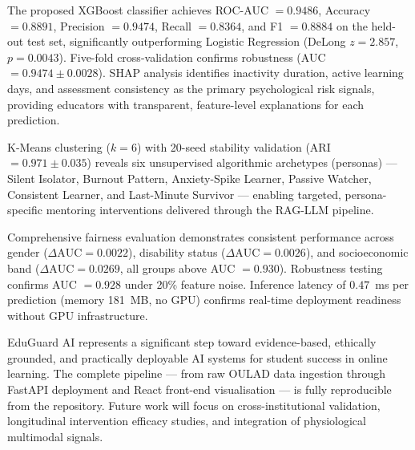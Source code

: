 The proposed XGBoost classifier achieves ROC-AUC $= 0.9486$, Accuracy
$= 0.8891$, Precision $= 0.9474$, Recall $= 0.8364$, and F1 $= 0.8884$
on the held-out test set, significantly outperforming Logistic Regression
(DeLong $z = 2.857$, $p = 0.0043$).
Five-fold cross-validation confirms robustness (AUC $= 0.9474 \pm 0.0028$).
SHAP analysis identifies inactivity duration, active learning days, and
assessment consistency as the primary psychological risk signals, providing
educators with transparent, feature-level explanations for each prediction.

K-Means clustering ($k=6$) with 20-seed stability validation
(ARI $= 0.971 \pm 0.035$) reveals six unsupervised algorithmic archetypes
(personas) — Silent Isolator, Burnout Pattern, Anxiety-Spike Learner,
Passive Watcher, Consistent Learner, and Last-Minute Survivor —
enabling targeted, persona-specific mentoring interventions delivered
through the RAG-LLM pipeline.

Comprehensive fairness evaluation demonstrates consistent performance
across gender ($\Delta\mathrm{AUC} = 0.0022$), disability status
($\Delta\mathrm{AUC} = 0.0026$), and socioeconomic band
($\Delta\mathrm{AUC} = 0.0269$, all groups above AUC $= 0.930$).
Robustness testing confirms AUC $= 0.928$ under 20\% feature noise.
Inference latency of $0.47$~ms per prediction (memory 181~MB, no GPU)
confirms real-time deployment readiness without GPU infrastructure.

EduGuard AI represents a significant step toward evidence-based,
ethically grounded, and practically deployable AI systems for student
success in online learning. The complete pipeline — from raw OULAD data
ingestion through FastAPI deployment and React front-end visualisation —
is fully reproducible from the repository. Future work will focus on
cross-institutional validation, longitudinal intervention efficacy
studies, and integration of physiological multimodal signals.



